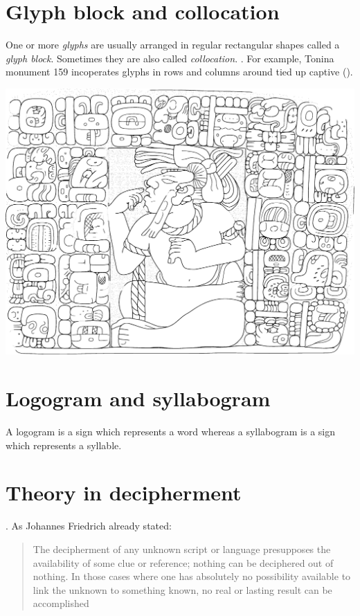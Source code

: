 \documentclass[../main.tex]{subfiles}
\begin{document}
\section{Glyph block and collocation}
One or more \emph{glyphs} are usually arranged in regular rectangular shapes called a 
\emph{glyph block}.
Sometimes they are also called \emph{collocation}.
.
For example, Tonina monument 159 incoperates glyphs in rows and columns around tied up captive 
().
\begin{center}
    \includegraphics[width=\textwidth,keepaspectratio]{img/tonina-monument-159}
    \label{fig:terminology-glyphs-in-rows-and-columns}
\end{center}

\section{Logogram and syllabogram}
A logogram is a sign which represents a word whereas a syllabogram is a sign which 
represents a syllable.

\section{Theory in decipherment}
.
As Johannes Friedrich already stated:
\blockquote[{\cite[152]{friedrich1957}}]{The decipherment of any unknown script or language 
presupposes the availability of some clue or reference; nothing can be deciphered out of nothing. 
In those cases where one has absolutely no possibility available to link the unknown to 
something known, \elide no real or lasting result can be accomplished}
\end{document}
